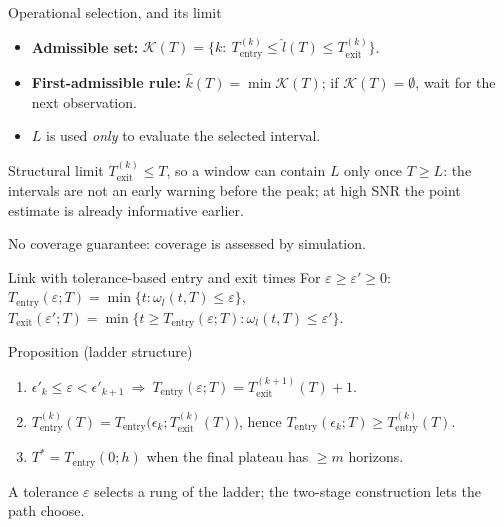 \documentclass[aspectratio=54,10pt]{beamer}
\begin{document}

\begin{frame}{Operational selection, and its limit}
\justifying
\begin{itemize}
	\item \textbf{Admissible set:} $\mathcal K(T)=\{k:\ T_{\mathrm{entry}}^{(k)}\le \hat l(T)\le T_{\mathrm{exit}}^{(k)}\}$.
	\item \textbf{First-admissible rule:} $\hat k(T)=\min\mathcal K(T)$; if $\mathcal K(T)=\emptyset$, wait for the next observation.
	\item $L$ is used \emph{only} to evaluate the selected interval.
\end{itemize}
\vspace{0.2cm}
\begin{block}{Structural limit}
	$T_{\mathrm{exit}}^{(k)}\le T$, so a window can contain $L$ only once $T\ge L$:
	the intervals are \alert{not} an early warning before the peak; at high SNR the point
	estimate is already informative earlier.
\end{block}
\small No coverage guarantee: coverage is assessed by simulation.
\end{frame}


\begin{frame}{Link with tolerance-based entry and exit times}
\justifying
For $\varepsilon\ge\varepsilon'\ge0$:
$T_{\mathrm{entry}}(\varepsilon;T)=\min\{t:\omega_l(t,T)\le\varepsilon\}$,
$T_{\mathrm{exit}}(\varepsilon';T)=\min\{t\ge T_{\mathrm{entry}}(\varepsilon;T):\omega_l(t,T)\le\varepsilon'\}$.
\begin{block}{Proposition (ladder structure)}
	\begin{enumerate}
		\item[(i)] $\epsilon'_k\le\varepsilon<\epsilon'_{k+1}\ \Rightarrow\ T_{\mathrm{entry}}(\varepsilon;T)=T_{\mathrm{exit}}^{(k+1)}(T)+1$.
		\item[(ii)] $T_{\mathrm{entry}}^{(k)}(T)=T_{\mathrm{entry}}\bigl(\epsilon_k;T_{\mathrm{exit}}^{(k)}(T)\bigr)$,
		hence $T_{\mathrm{entry}}(\epsilon_k;T)\ge T_{\mathrm{entry}}^{(k)}(T)$.
		\item[(iii)] $T^{*}=T_{\mathrm{entry}}(0;h)$ when the final plateau has $\ge m$ horizons.
	\end{enumerate}
\end{block}
\small A tolerance $\varepsilon$ selects a rung of the ladder; the two-stage construction lets the path choose.
\end{frame}
\end{document}
